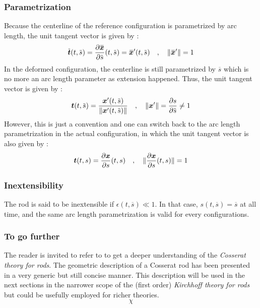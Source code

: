 \subsubsection{Parametrization}

Because the centerline of the reference configuration is parametrized by arc length, the unit tangent vector is given by :
\begin{equation}	
	\overbar{\vect{t}}(t, \overbar{s}) = \frac{\partial \overbar{\vect{x}}}{\partial \overbar{s}} (t, \overbar{s}) = \overbar{\vect{x}}'(t, \overbar{s})
	\quad , \quad
	\norm{\overbar{\vect{x}}'} = 1
\end{equation}
In the deformed configuration, the centerline is still parametrized by $\overbar{s}$ which is no more an arc length parameter as extension happened. Thus, the unit tangent vector is given by :
\begin{equation}	
	\vect{t}(t, \overbar{s}) = \frac{{\vect{x}}'(t, \overbar{s})}{\norm{{\vect{x}}'(t, \overbar{s})}}
	\quad , \quad
	\norm{\vect{x}'} = \frac{\partial s}{\partial \overbar{s}}  \neq 1
\end{equation}
However, this is just a convention and one can switch back to the arc length parametrization in the actual configuration, in which the unit tangent vector is also given by :
\begin{equation}	
	\boldsymbol{t}(t, s) = \frac{\partial \boldsymbol{x}}{\partial s} (t, s)
	\quad , \quad
	\lVert \frac{\partial \boldsymbol{x}}{\partial s} (t, s)\rVert = 1
\end{equation}

\subsubsection{Inextensibility}

The rod is said to be inextensible if $\epsilon(t, \overbar{s}) \ll 1$. In that case, $s(t, \overbar{s}) = \overbar{s}$ at all time, and the same arc length parametrization is valid for every configurations.

\subsubsection{To go further}

The reader is invited to refer to \cite{Antman2005} to get a deeper understanding of the \emph{Cosserat theory for rods}. The geometric description of a Cosserat rod has been presented in a very generic but still concise manner. This description will be used in the next sections in the narrower scope of the (first order) \emph{Kirchhoff theory for rods} but could be usefully employed for richer theories. 
\begin{equation}	
	\chi
\end{equation}

